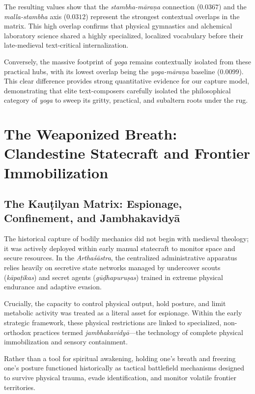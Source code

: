 \documentclass[11pt,twoside,letterpaper]{article}
\begin{document}
The resulting values show that the \textit{stambha-māraṇa} connection ($0.0367$) and the \textit{malla-stambha} axis ($0.0312$) represent the strongest contextual overlaps in the matrix. This high overlap confirms that physical gymnastics and alchemical laboratory science shared a highly specialized, localized vocabulary before their late-medieval text-critical internalization.

Conversely, the massive footprint of \textit{yoga} remains contextually isolated from these practical hubs, with its lowest overlap being the \textit{yoga-māraṇa} baseline ($0.0099$). This clear difference provides strong quantitative evidence for our capture model, demonstrating that elite text-composers carefully isolated the philosophical category of \textit{yoga} to sweep its gritty, practical, and subaltern roots under the rug.


\section{The Weaponized Breath: Clandestine Statecraft and Frontier Immobilization}

\subsection{The Kauṭilyan Matrix: Espionage, Confinement, and Jambhakavidyā}
The historical capture of bodily mechanics did not begin with medieval theology; it was actively deployed within early manual statecraft to monitor space and secure resources. In the \textit{Arthaśāstra}, the centralized administrative apparatus relies heavily on secretive state networks managed by undercover scouts (\textit{kāpaṭikas}) and secret agents (\textit{gūḍhapuruṣas}) trained in extreme physical endurance and adaptive evasion. 

Crucially, the capacity to control physical output, hold posture, and limit metabolic activity was treated as a literal asset for espionage. Within the early strategic framework, these physical restrictions are linked to specialized, non-orthodox practices termed \textit{jambhakavidyā}—the technology of complete physical immobilization and sensory containment. 

Rather than a tool for spiritual awakening, holding one's breath and freezing one's posture functioned historically as tactical battlefield mechanisms designed to survive physical trauma, evade identification, and monitor volatile frontier territories.
\end{document}
